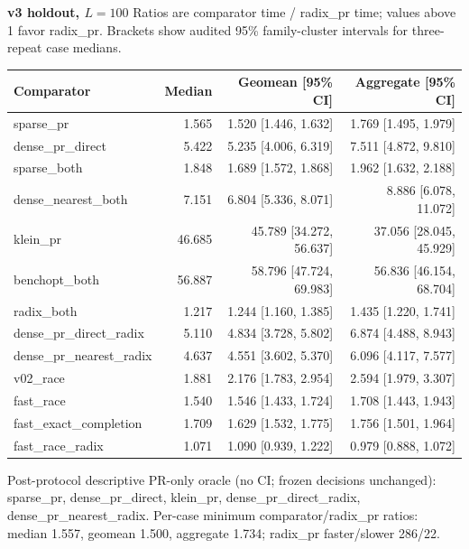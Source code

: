 \par\noindent\textbf{v3 holdout, $L=100$}
Ratios are comparator time / radix\_pr time; values above 1 favor radix\_pr.
Brackets show audited 95\% family-cluster intervals for three-repeat case medians.
\par\smallskip
\begin{tabular}{lrrr}
Comparator & Median & Geomean [95\% CI] & Aggregate [95\% CI] \\
\hline
sparse\_pr & 1.565 & 1.520 [1.446, 1.632] & 1.769 [1.495, 1.979] \\
dense\_pr\_direct & 5.422 & 5.235 [4.006, 6.319] & 7.511 [4.872, 9.810] \\
sparse\_both & 1.848 & 1.689 [1.572, 1.868] & 1.962 [1.632, 2.188] \\
dense\_nearest\_both & 7.151 & 6.804 [5.336, 8.071] & 8.886 [6.078, 11.072] \\
klein\_pr & 46.685 & 45.789 [34.272, 56.637] & 37.056 [28.045, 45.929] \\
benchopt\_both & 56.887 & 58.796 [47.724, 69.983] & 56.836 [46.154, 68.704] \\
radix\_both & 1.217 & 1.244 [1.160, 1.385] & 1.435 [1.220, 1.741] \\
dense\_pr\_direct\_radix & 5.110 & 4.834 [3.728, 5.802] & 6.874 [4.488, 8.943] \\
dense\_pr\_nearest\_radix & 4.637 & 4.551 [3.602, 5.370] & 6.096 [4.117, 7.577] \\
v02\_race & 1.881 & 2.176 [1.783, 2.954] & 2.594 [1.979, 3.307] \\
fast\_race & 1.540 & 1.546 [1.433, 1.724] & 1.708 [1.443, 1.943] \\
fast\_exact\_completion & 1.709 & 1.629 [1.532, 1.775] & 1.756 [1.501, 1.964] \\
fast\_race\_radix & 1.071 & 1.090 [0.939, 1.222] & 0.979 [0.888, 1.072] \\
\end{tabular}
\par\smallskip
Post-protocol descriptive PR-only oracle (no CI; frozen decisions unchanged): sparse\_pr, dense\_pr\_direct, klein\_pr, dense\_pr\_direct\_radix, dense\_pr\_nearest\_radix.
Per-case minimum comparator/radix\_pr ratios: median 1.557, geomean 1.500, aggregate 1.734; radix\_pr faster/slower 286/22.

